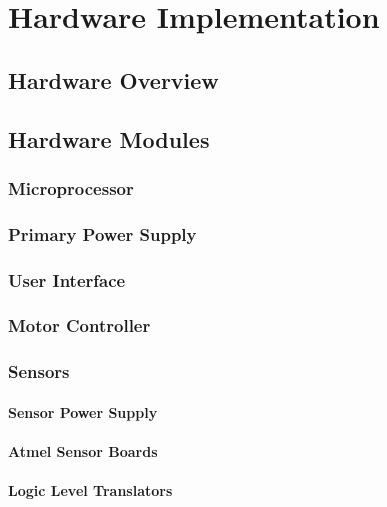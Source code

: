 \chapter{Hardware Implementation}
\label{Chapter 4}


\section{Hardware Overview}


\section{Hardware Modules}


\subsection{Microprocessor}


\subsection{Primary Power Supply}


\subsection{User Interface}


\subsection{Motor Controller}


\subsection{Sensors}


\subsubsection{Sensor Power Supply}


\subsubsection{Atmel Sensor Boards}


\subsubsection{Logic Level Translators}

